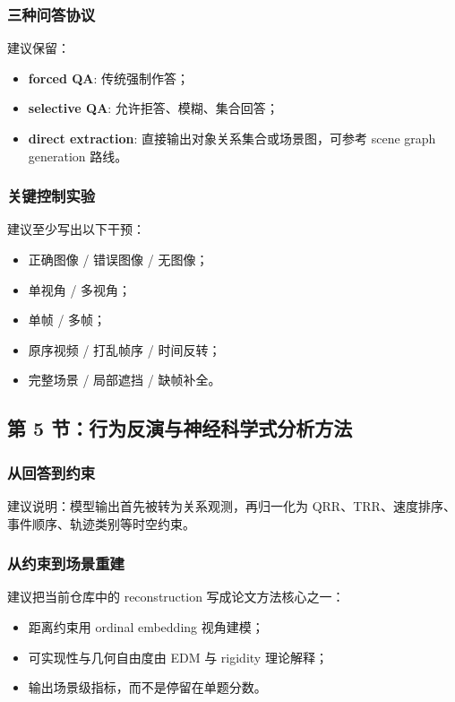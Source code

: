 \documentclass[UTF8,12pt,fontset=none]{ctexart}
\begin{document}
\subsubsection{三种问答协议}
建议保留：
\begin{itemize}
  \item \textbf{forced QA}: 传统强制作答；
  \item \textbf{selective QA}: 允许拒答、模糊、集合回答\cite{whitehead2022reliablevqa,eisenschlos2024selectivevqa,khan2024consistency}；
  \item \textbf{direct extraction}: 直接输出对象关系集合或场景图，可参考 scene graph generation 路线\cite{kim2024llm4sgg,dutta2025openworldsgg}。
\end{itemize}

\subsubsection{关键控制实验}
建议至少写出以下干预：
\begin{itemize}
  \item 正确图像 / 错误图像 / 无图像；
  \item 单视角 / 多视角；
  \item 单帧 / 多帧；
  \item 原序视频 / 打乱帧序 / 时间反转；
  \item 完整场景 / 局部遮挡 / 缺帧补全。
\end{itemize}

\subsection{第 5 节：行为反演与神经科学式分析方法}

\subsubsection{从回答到约束}
建议说明：模型输出首先被转为关系观测，再归一化为 QRR、TRR、速度排序、事件顺序、轨迹类别等时空约束。

\subsubsection{从约束到场景重建}
建议把当前仓库中的 reconstruction 写成论文方法核心之一：
\begin{itemize}
  \item 距离约束用 ordinal embedding 视角建模\cite{agarwal2007gnmds,ma2018robustordinal}；
  \item 可实现性与几何自由度由 EDM 与 rigidity 理论解释\cite{dokmanic2015edm,zhao2019bearingrigidity,chen2021anglerigidity}；
  \item 输出场景级指标，而不是停留在单题分数。
\end{itemize}
\end{document}
